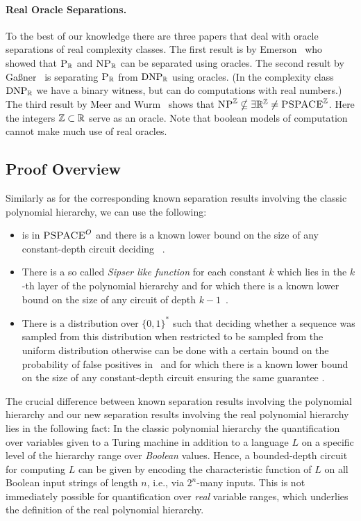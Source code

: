 \documentclass{article}
\begin{document}
\paragraph{Real Oracle Separations.}
To the best of our knowledge there are three papers that deal with oracle separations of real complexity classes.
The first result is by Emerson~\cite{emerson1994relativizations} who showed that $\textsc{P}_\mathbb{R}$ and $\textsc{NP}_\mathbb{R}$ can be separated using oracles.
The second result by Ga{\ss}ner~\cite{gassner2010separation} is separating $\textsc{P}_\mathbb{R}$ from $\text{DNP}_\mathbb{R}$ using oracles.
(In the complexity class $\text{DNP}_\mathbb{R}$ we have a binary witness, but can do computations with real numbers.)
The third result by Meer and Wurm~\cite{MeerWurm2025} shows that 
$\textsc{NP}^\mathbb{Z} \nsubseteq \exists\mathbb{R}^\mathbb{Z} \neq \textsc{PSPACE}^\mathbb{Z}$.
Here the integers $\mathbb{Z}\subset \mathbb{R}$ serve as an oracle.
Note that boolean models of computation cannot make much use of real oracles.

\subsection{Proof Overview}
Similarly as for the corresponding known separation results involving the classic polynomial hierarchy, we can use the following:
\begin{itemize}
    \item \ParityA is in \(\textsc{PSPACE}^O\) and there is a known lower bound on the size of any constant-depth circuit deciding \ParityA~\cite{Cai86}.
    \item There is a so called \emph{Sipser like function} for each constant \(k\) which lies in the \(k\)-th layer of the polynomial hierarchy and for which there is a known lower bound on the size of any circuit of depth \(k - 1\)~\cite{Yao85, Sip83}.
    \item There is a distribution over \(\{0,1\}^*\) such that deciding whether a sequence was sampled from this distribution when restricted to be sampled from the uniform distribution otherwise can be done with a certain bound on the probability of false positives in \BQP\ and for which there is a known lower bound on the size of any constant-depth circuit ensuring the same guarantee \cite{RT22}.
\end{itemize}

The crucial difference between known separation results involving the polynomial hierarchy and our new separation results involving the real polynomial hierarchy lies in the following fact:
In the classic polynomial hierarchy the quantification over variables given to a Turing machine in addition to a language \(L\) on a specific level of the hierarchy range over \textit{Boolean} values.
Hence, a bounded-depth circuit for computing \(L\) can be given by encoding the characteristic function of \(L\) on all Boolean input strings of length \(n\), i.e., via \(2^n\)-many inputs.
This is not immediately possible for quantification over \textit{real} variable ranges, which underlies the definition of the real polynomial hierarchy.
\end{document}
